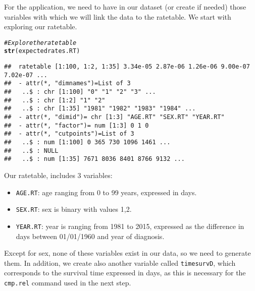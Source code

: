 \documentclass[a4paper,11pt]{article}\usepackage[]{graphicx}\usepackage[]{color}
\makeatletter
\newcommand{\hlcom}[1]{\textcolor[rgb]{0.678,0.584,0.686}{\textit{#1}}}%
\newcommand{\hlstd}[1]{\textcolor[rgb]{0.345,0.345,0.345}{#1}}%
\newcommand{\hlkwd}[1]{\textcolor[rgb]{0.737,0.353,0.396}{\textbf{#1}}}%
\newenvironment{kframe}{%
 \def\at@end@of@kframe{}%
 \ifinner\ifhmode%
  \def\at@end@of@kframe{\end{minipage}}%
  \begin{minipage}{\columnwidth}%
 \fi\fi%
 \def\FrameCommand##1{\hskip\@totalleftmargin \hskip-\fboxsep
 \colorbox{shadecolor}{##1}\hskip-\fboxsep
     \hskip-\linewidth \hskip-\@totalleftmargin \hskip\columnwidth}%
 \MakeFramed {\advance\hsize-\width
   \@totalleftmargin\z@ \linewidth\hsize
   \@setminipage}}%
 {\par\unskip\endMakeFramed%
 \at@end@of@kframe}
\newenvironment{knitrout}{}{} %
\makeatother
\begin{document}
For the application, we need to have in our dataset (or create if needed) those variables with which we will link the data to the ratetable. We start with exploring our ratetable.

\begin{knitrout}
\color{fgcolor}\begin{kframe}
\begin{alltt}
\hlcom{# Explore the ratetable}
\hlkwd{str}\hlstd{(expectedrates.RT)}
\end{alltt}
\begin{verbatim}
##  ratetable [1:100, 1:2, 1:35] 3.34e-05 2.87e-06 1.26e-06 9.00e-07 7.02e-07 ...
##  - attr(*, "dimnames")=List of 3
##   ..$ : chr [1:100] "0" "1" "2" "3" ...
##   ..$ : chr [1:2] "1" "2"
##   ..$ : chr [1:35] "1981" "1982" "1983" "1984" ...
##  - attr(*, "dimid")= chr [1:3] "AGE.RT" "SEX.RT" "YEAR.RT"
##  - attr(*, "factor")= num [1:3] 0 1 0
##  - attr(*, "cutpoints")=List of 3
##   ..$ : num [1:100] 0 365 730 1096 1461 ...
##   ..$ : NULL
##   ..$ : num [1:35] 7671 8036 8401 8766 9132 ...
\end{verbatim}
\end{kframe}
\end{knitrout}
Our ratetable, includes 3 variables:
\begin{itemize}
  \item \texttt{AGE.RT}: age ranging from 0 to 99 years, expressed in days.
  \item \texttt{SEX.RT}: sex is binary with values {1,2}.
  \item \texttt{YEAR.RT}: year is ranging from 1981 to 2015, expressed as the difference in days between 01/01/1960 and year of diagnosis.
\end{itemize}
Except for sex, none of these variables exist in our data, so we need to generate them. In addition, we create also another variable called \texttt{timesurvD}, which corresponds to the survival time expressed in days, as this is necessary for the \texttt{cmp.rel} command used in the next step. 
\end{document}
